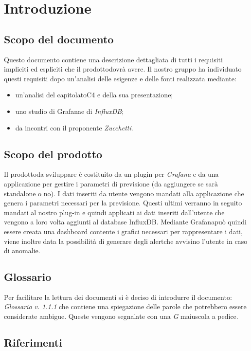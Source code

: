 
\section{Introduzione}
	\subsection{Scopo del documento}
	Questo documento contiene una descrizione dettagliata di tutti i requisiti impliciti ed espliciti che il prodotto\glosp dovrà avere. Il nostro gruppo ha individuato questi requisiti dopo un'analisi delle esigenze e delle fonti realizzata mediante: 
	\begin{itemize}
		\item un'analisi del capitolato\glosp C4 e della sua presentazione; 
		\item uno studio di Grafana\glosp e di \textit{InfluxDB};
		\item da incontri con il proponente \textit{Zucchetti}.
	\end{itemize}
	\subsection{Scopo del prodotto}
	Il prodotto\glosp da sviluppare è costituito da un plugin per \textit{Grafana} e da una applicazione per gestire i parametri di previsione (da aggiungere se sarà standalone o no). I dati inseriti da utente vengono mandati alla applicazione che genera i parametri necessari per la previsione. Questi ultimi verranno in seguito mandati al nostro plug-in e quindi applicati ai dati inseriti dall'utente che vengono a loro volta aggiunti al database InfluxDB. Mediante Grafana\glosp può quindi essere creata una dashboard contente i grafici necessari per rappresentare i dati, viene inoltre data la possibilità di generare degli alert\glosp che avvisino l'utente in caso di anomalie.
		
	\subsection{Glossario}
	Per facilitare la lettura dei documenti si è deciso di introdurre il documento: \textit{Glossario v. 1.1.1} che contiene una spiegazione delle parole che potrebbero essere considerate ambigue. Queste vengono segnalate con una \textit{G} maiuscola a pedice.  
	\subsection{Riferimenti}
